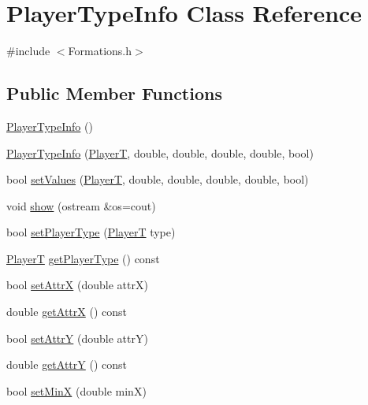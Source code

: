 \hypertarget{classPlayerTypeInfo}{}\section{Player\+Type\+Info Class Reference}
\label{classPlayerTypeInfo}


{\ttfamily \#include $<$Formations.\+h$>$}

\subsection*{Public Member Functions}
\begin{DoxyCompactItemize}
\item 
\hyperlink{classPlayerTypeInfo_a0d23e2245173fb68652d30472bac976c}{Player\+Type\+Info} ()
\item 
\hyperlink{classPlayerTypeInfo_a23ef7e907e8ddaea6077d4a127ffe5c6}{Player\+Type\+Info} (\hyperlink{SoccerTypes_8h_a88daf580b042467ccd4098107cffc718}{PlayerT}, double, double, double, double, bool)
\item 
bool \hyperlink{classPlayerTypeInfo_a9fc88d58d7c8b6ad7ce01b231fbdabc9}{set\+Values} (\hyperlink{SoccerTypes_8h_a88daf580b042467ccd4098107cffc718}{PlayerT}, double, double, double, double, bool)
\item 
void \hyperlink{classPlayerTypeInfo_a881454b4be3c2b00e81845ff4eacf60e}{show} (ostream \&os=cout)
\item 
bool \hyperlink{classPlayerTypeInfo_ad349989197be5160f386221a49fd7fae}{set\+Player\+Type} (\hyperlink{SoccerTypes_8h_a88daf580b042467ccd4098107cffc718}{PlayerT} type)
\item 
\hyperlink{SoccerTypes_8h_a88daf580b042467ccd4098107cffc718}{PlayerT} \hyperlink{classPlayerTypeInfo_a58fb978dd0934a48d5adc3c3517e17d4}{get\+Player\+Type} () const 
\item 
bool \hyperlink{classPlayerTypeInfo_acb2682c0b6b2da1f4222f516671d892e}{set\+AttrX} (double attrX)
\item 
double \hyperlink{classPlayerTypeInfo_a997ac2e754dcb710f4c54932e2f994c4}{get\+AttrX} () const 
\item 
bool \hyperlink{classPlayerTypeInfo_a56a9cca614d74ae01160f50879aaaf8e}{set\+AttrY} (double attrY)
\item 
double \hyperlink{classPlayerTypeInfo_a29f36473d446a262ac2c45c35ca62ab4}{get\+AttrY} () const 
\item 
bool \hyperlink{classPlayerTypeInfo_a9061468f66ca15931da41b5d72e62ff3}{set\+MinX} (double minX)

\end{DoxyCompactItemize}
